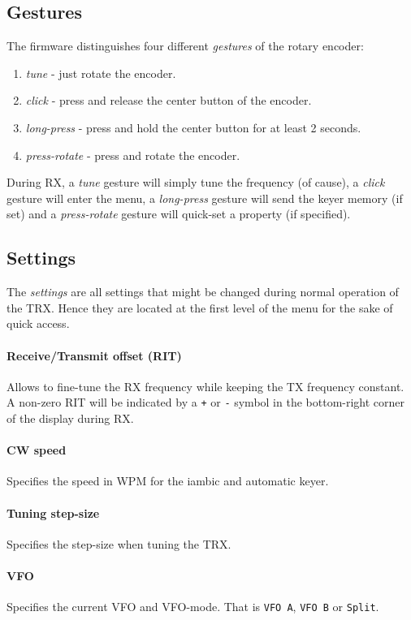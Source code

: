 \documentclass[10pt, a4paper,twoside]{scrartcl}
\begin{document}
\subsection{Gestures}
The firmware distinguishes four different \emph{gestures} of the rotary encoder:
\begin{enumerate}
 \item \emph{tune} - just rotate the encoder.
 \item \emph{click} - press and release the center button of the encoder.
 \item \emph{long-press} - press and hold the center button for at least 2 seconds.
 \item \emph{press-rotate} - press and rotate the encoder.
\end{enumerate}

During RX, a \emph{tune} gesture will simply tune the frequency (of cause), a \emph{click} gesture will enter the menu, a \emph{long-press} gesture will send the keyer memory (if set) and a \emph{press-rotate} gesture will quick-set a property (if specified).


\subsection{Settings}
The \emph{settings} are all settings that might be changed during normal operation of the TRX. Hence they are located at the first level of the menu for the sake of quick access.
 
\paragraph{Receive/Transmit offset (RIT)}
Allows to fine-tune the RX frequency while keeping the TX frequency constant. A non-zero RIT will be indicated by a \texttt{+} or \texttt{-} symbol in the bottom-right corner of the display during RX. 

\paragraph{CW speed}
Specifies the speed in WPM for the iambic and automatic keyer.

\paragraph{Tuning step-size}
Specifies the step-size when tuning the TRX.

\paragraph{VFO}
Specifies the current VFO and VFO-mode. That is \texttt{VFO A}, \texttt{VFO B} or \texttt{Split}.
\end{document}
